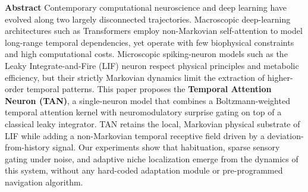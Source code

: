 \begin{center}
\begin{minipage}{0.92\textwidth}
\small
\noindent\textbf{Abstract}\quad
Contemporary computational neuroscience and deep learning have evolved along two largely disconnected trajectories. Macroscopic deep-learning architectures such as Transformers employ non-Markovian self-attention to model long-range temporal dependencies, yet operate with few biophysical constraints and high computational costs. Microscopic spiking-neuron models such as the Leaky Integrate-and-Fire (LIF) neuron respect physical principles and metabolic efficiency, but their strictly Markovian dynamics limit the extraction of higher-order temporal patterns. This paper proposes the \textbf{Temporal Attention Neuron (TAN)}, a single-neuron model that combines a Boltzmann-weighted temporal attention kernel with neuromodulatory surprise gating on top of a classical leaky integrator. TAN retains the local, Markovian physical substrate of LIF while adding a non-Markovian temporal receptive field driven by a deviation-from-history signal. Our experiments show that habituation, sparse sensory gating under noise, and adaptive niche localization emerge from the dynamics of this system, without any hard-coded adaptation module or pre-programmed navigation algorithm.


\end{minipage}
\end{center}
